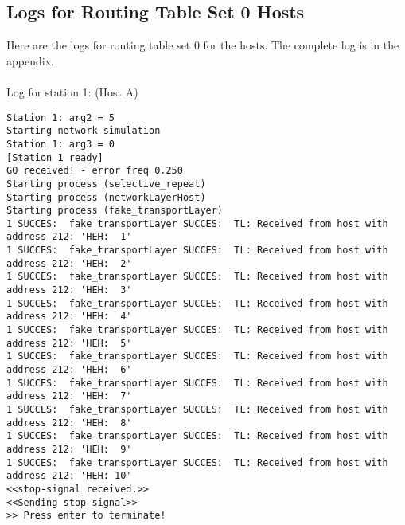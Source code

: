 \subsection{Logs for Routing Table Set 0 Hosts}
Here are the logs for routing table set 0 for the hosts. The complete log is in the appendix.\\
\\
Log for station 1: (Host A)
\begin{lstlisting}[breaklines=true]
Station 1: arg2 = 5
Starting network simulation
Station 1: arg3 = 0
[Station 1 ready]
GO received! - error freq 0.250
Starting process (selective_repeat)
Starting process (networkLayerHost)
Starting process (fake_transportLayer)
1 SUCCES:  fake_transportLayer SUCCES:  TL: Received from host with address 212: 'HEH:  1'
1 SUCCES:  fake_transportLayer SUCCES:  TL: Received from host with address 212: 'HEH:  2'
1 SUCCES:  fake_transportLayer SUCCES:  TL: Received from host with address 212: 'HEH:  3'
1 SUCCES:  fake_transportLayer SUCCES:  TL: Received from host with address 212: 'HEH:  4'
1 SUCCES:  fake_transportLayer SUCCES:  TL: Received from host with address 212: 'HEH:  5'
1 SUCCES:  fake_transportLayer SUCCES:  TL: Received from host with address 212: 'HEH:  6'
1 SUCCES:  fake_transportLayer SUCCES:  TL: Received from host with address 212: 'HEH:  7'
1 SUCCES:  fake_transportLayer SUCCES:  TL: Received from host with address 212: 'HEH:  8'
1 SUCCES:  fake_transportLayer SUCCES:  TL: Received from host with address 212: 'HEH:  9'
1 SUCCES:  fake_transportLayer SUCCES:  TL: Received from host with address 212: 'HEH: 10'
<<stop-signal received.>>
<<Sending stop-signal>>
>> Press enter to terminate!
\end{lstlisting}

